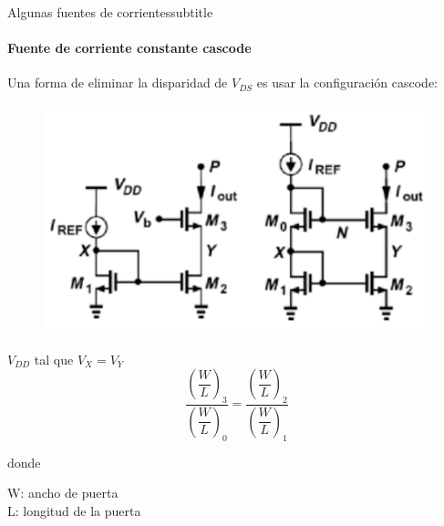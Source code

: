 \documentclass[aspectratio=169, 8pt]{beamer}
\begin{document}
\begin{frame}{Algunas fuentes de corrientes}{subtitle}
\framesubtitle{Fuente de corriente constante cascode}
Una forma de eliminar la disparidad de $V_{DS}$ es usar la configuración
cascode:
\begin{figure}[!ht]
	\includegraphics[scale=0.3]{IMAGENES/image3.png}
\end{figure}
$V_{DD}$ tal que $V_X = V_Y$
$$\dfrac{\left(\dfrac{W}{L}\right)_3}
{\left(\dfrac{W}{L}\right)_0} = 
\dfrac{\left(\dfrac{W}{L}\right)_2}
{\left(\dfrac{W}{L}\right)_1}$$ 

donde
\begin{center}
	\hspace{-5mm}W: ancho de puerta\\
	L: longitud de la puerta
\end{center}
\end{frame}
\end{document}
